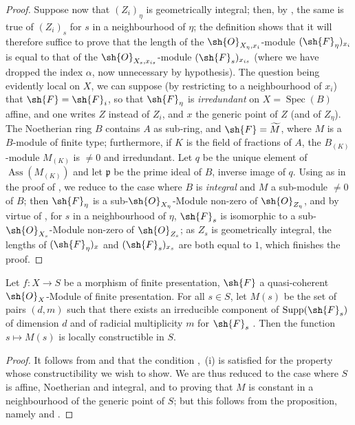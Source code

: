 \begin{proof}
Suppose now that $(Z_i)_\eta$ is geometrically integral; then, by , the same is true of $(Z_i)_s$ for $s$ in a neighbourhood of $\eta$; the definition  shows that it will therefore suffice to prove that the length of the $\sh{O}_{X_\eta,x_i}$-module $(\sh{F}_\eta)_{x_i}$ is equal to that of the $\sh{O}_{X_s,x_{is}}$-module $(\sh{F}_s)_{x_{is}}$ (where we have dropped the index $\alpha$, now unnecessary by hypothesis).
The question being evidently local on $X$, we can suppose (by restricting to a neighbourhood of $x_i$) that $\sh{F}=\sh{F}_i$, so that $\sh{F}_\eta$ is \emph{irredundant} on $X=\operatorname{Spec}(B)$ affine, and one writes $Z$ instead of $Z_i$, and $x$ the generic point of $Z$ (and of $Z_\eta$).
The Noetherian ring $B$ contains $A$ as sub-ring, and $\sh{F}=\widetilde{M}$, where $M$ is a $B$-module of finite type; furthermore, if $K$ is the field of fractions of $A$, the $B_{(K)}$-module $M_{(K)}$ is $\neq 0$ and irredundant.
Let $q$ be the unique element of $\operatorname{Ass}(M_{(K)})$ and let $\mathfrak{p}$ be the prime ideal of $B$, inverse image of $q$.
Using  as in the proof of , we reduce to the case where $B$ is \emph{integral} and $M$ a sub-module $\neq 0$ of $B$; then $\sh{F}_\eta$ is a sub-$\sh{O}_{X_\eta}$-Module non-zero of $\sh{O}_{Z_\eta}$, and by virtue of , for $s$ in a neighbourhood of $\eta$, $\sh{F}_s$ is isomorphic to a sub-$\sh{O}_{X_s}$-Module non-zero of $\sh{O}_{Z_s}$; as $Z_s$ is geometrically integral, the lengths of $(\sh{F}_\eta)_x$ and $(\sh{F}_s)_{x_s}$ are both equal to $1$, which finishes the proof.
\end{proof}

\begin{corollary}[9.8.7]
\label{IV.9.8.7}
Let $f:X\to S$ be a morphism of finite presentation, $\sh{F}$ a quasi-coherent $\sh{O}_X$-Module of finite presentation.
For all $s\in S$, let $M(s)$ be the set of pairs $(d,m)$ such that there exists an irreducible component of $\operatorname{Supp}(\sh{F}_s)$ of dimension $d$ and of radicial multiplicity $m$ for $\sh{F}_s$ .
Then the function $s\mapsto M(s)$ is locally constructible in $S$.
\end{corollary}

\begin{proof}
\label{IV.9.8.7-proof}
It follows from  and  that the condition ,~(i) is satisfied for the property whose constructibility we wish to show.
We are thus reduced to the case where $S$ is affine, Noetherian and integral, and to proving that $M$ is constant in a neighbourhood of the generic point of $S$; but this follows from the proposition, namely  and .
\end{proof}

